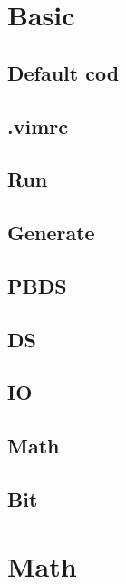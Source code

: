 \section{Basic}

\subsection{Default cod}


\subsection{.vimrc}


\subsection{Run}


\subsection{Generate}


\subsection{PBDS}


\subsection{DS}


\subsection{IO}


\subsection{Math}


\subsection{Bit}


\clearpage

\section{Math}

